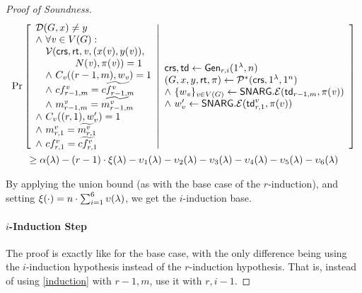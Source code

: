 \begin{proof}[Proof of Soundness]
\begin{gather*}
    \Pr \left[ \begin{array}{ll} 
    \mathcal{D}(G, x)\neq y  \\
    \wedge\ \forall \mathit{ v }\in V(G) : \\
    \quad \mathcal{V}(\mathsf{crs}, \mathsf{rt}, \mathit{ v }, (x(\mathit{ v }), y(\mathit{ v })),\\
    \qquad \qquad N(\mathit{ v }), \pi(\mathit{ v })) = 1 \\
    \quad \wedge ~C_{\mathit{ v }}((r-1, m), w_{\mathit{ v }}) = 1 \\
    \quad \wedge ~cf^{\mathit{ v }}_{r-1, m} = \widetilde{cf^{\mathit{ v }}_{r-1,m}} \\
    \quad \wedge ~m^{\mathit{ v }}_{r-1,m} = \widetilde{m^{\mathit{ v }}_{r-1,m}} \\
    \wedge ~C_v((r,1),w'_v) = 1 \\
    \wedge ~m^v_{r,1} = \widetilde{m^v_{r,1}} \\
    \wedge ~cf^v_{r, 1} = \widetilde{cf^v_{r,1}}
     \end{array} \middle\vert \begin{array}{ll} 
    \mathsf{crs}, \mathsf{td} \leftarrow \mathsf{Gen}_{r,i}(1^\lambda, n) \\
    (G, x, y, \mathsf{rt}, \pi) \leftarrow \mathcal{P}^*(\mathsf{crs}, 1^\lambda, 1^n)\\
    \wedge ~\{w_{\mathit{ v }}\}_{\mathit{ v }\in V(G)}\leftarrow \mathsf{SNARG}.\mathcal{E}(\mathsf{td}_{r-1,m}, \pi(\mathit{ v })) \\
    \wedge ~w'_v\leftarrow \mathsf{SNARG}.\mathcal{E}(\mathsf{td}^v_{r,1}, \pi(v)) \\
     \end{array} \right]\\
    \geq \alpha(\lambda) - (r-1)\cdot\xi(\lambda) - \upsilon_1(\lambda) - \upsilon_2(\lambda) - \upsilon_3(\lambda) - \upsilon_4(\lambda) - \upsilon_5(\lambda) -\upsilon_6(\lambda)
\end{gather*}

By applying the union bound (as with the base case of the $r$-induction), and setting $\xi(\cdot) = n\cdot\sum_{i=1}^6 \upsilon(\lambda)$, we get the $i$-induction base.


\paragraph{$i$-Induction Step} The proof is exactly like for the base case, with the only difference being using the $i$-induction hypothesis instead of the $r$-induction hypothesis. That is, instead of using \cref{induction} with $r-1,m$, use it with $r,i-1$.



\end{proof}